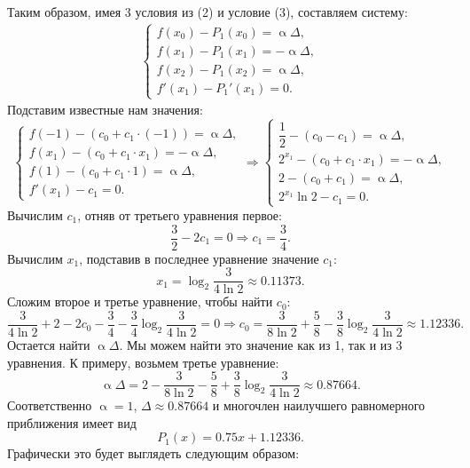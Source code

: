 \documentclass[a4paper, 12pt]{article}
\renewcommand{\alpha}{\upalpha}
\begin{document}
	Таким образом, имея 3 условия из (2) и условие (3), составляем систему:
	\begin{eqnarray}
		\begin{cases}
			f(x_0) - P_1(x_0) = \alpha\Delta,\\
			f(x_1) - P_1(x_1) = -\alpha\Delta,\\
			f(x_2) - P_1(x_2) = \alpha\Delta,\\
			f'(x_1) - P_1'(x_1) = 0.
		\end{cases}
	\end{eqnarray}
	Подставим известные нам значения: $$\begin{cases}
		f(-1) - (c_0 + c_1 \cdot (-1)) = \alpha\Delta,\\
		f(x_1) - (c_0 + c_1\cdot x_1) = -\alpha\Delta,\\
		f(1) - (c_0 + c_1 \cdot 1) = \alpha\Delta,\\
		f'(x_1) - c_1 = 0.
	\end{cases}\Rightarrow \begin{cases}
	\dfrac12 - (c_0 - c_1) = \alpha\Delta,\\
	2^{x_1} - (c_0 + c_1\cdot x_1) = -\alpha\Delta,\\
	2 - (c_0 + c_1) = \alpha\Delta,\\
	2^{x_1}\ln2 - c_1 = 0.
	\end{cases}$$
	Вычислим $c_1$, отняв от третьего уравнения первое:
	$$\dfrac{3}{2} - 2c_1 = 0 \Rightarrow c_1 = \dfrac34.$$
	Вычислим $x_1$, подставив в последнее уравнение значение $c_1$:
	$$x_1 = \log_2\dfrac{3}{4\ln 2}\approx 0.11373.$$
	Сложим второе и третье уравнение, чтобы найти $c_0$:
	$$\dfrac{3}{4\ln2} + 2 - 2c_0 - \dfrac34 -\dfrac34 \log_2\dfrac{3}{4\ln 2} = 0 \Rightarrow c_0 = \dfrac{3}{8\ln 2} + \dfrac58 - \dfrac{3}{8}\log_2\dfrac{3}{4\ln 2}\approx 1.12336.$$
	Остается найти $\alpha\Delta$. Мы можем найти это значение как из 1, так и из 3 уравнения. К примеру, возьмем третье уравнение:
	$$\alpha\Delta = 2 - \dfrac{3}{8\ln 2} - \dfrac58 + \dfrac{3}{8}\log_2\dfrac{3}{4\ln 2}\approx 0.87664.$$
	Соответственно $\alpha = 1$, $\Delta \approx 0.87664$ и многочлен наилучшего равномерного приближения имеет вид $$P_1(x) = 0.75x + 1.12336.$$ 
	Графически это будет выглядеть следующим образом:
	\begin{center}\end{center}
\end{document}
